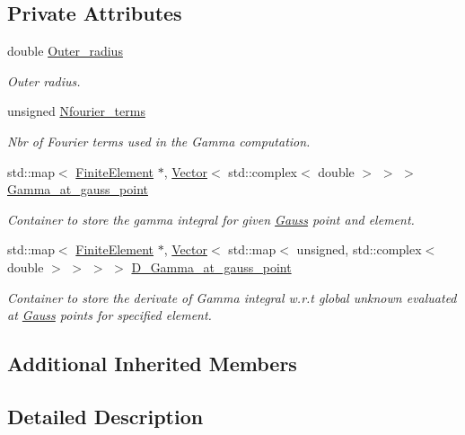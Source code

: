 \subsection*{Private Attributes}
\begin{DoxyCompactItemize}
\item 
double \hyperlink{classoomph_1_1HelmholtzDtNMesh_abcc058c646023fbde29369b858d12e8e}{Outer\+\_\+radius}
\begin{DoxyCompactList}\small\item\em Outer radius. \end{DoxyCompactList}\item 
unsigned \hyperlink{classoomph_1_1HelmholtzDtNMesh_a606cf4e783b8dc36f3c059c4ec8ac503}{Nfourier\+\_\+terms}
\begin{DoxyCompactList}\small\item\em Nbr of Fourier terms used in the Gamma computation. \end{DoxyCompactList}\item 
std\+::map$<$ \hyperlink{classoomph_1_1FiniteElement}{Finite\+Element} $\ast$, \hyperlink{classoomph_1_1Vector}{Vector}$<$ std\+::complex$<$ double $>$ $>$ $>$ \hyperlink{classoomph_1_1HelmholtzDtNMesh_aacfbe2ef31d93e1071460f3b2bad2480}{Gamma\+\_\+at\+\_\+gauss\+\_\+point}
\begin{DoxyCompactList}\small\item\em Container to store the gamma integral for given \hyperlink{classoomph_1_1Gauss}{Gauss} point and element. \end{DoxyCompactList}\item 
std\+::map$<$ \hyperlink{classoomph_1_1FiniteElement}{Finite\+Element} $\ast$, \hyperlink{classoomph_1_1Vector}{Vector}$<$ std\+::map$<$ unsigned, std\+::complex$<$ double $>$ $>$ $>$ $>$ \hyperlink{classoomph_1_1HelmholtzDtNMesh_a1a70bd5ef6e20837f7c9c0ce7abdd91b}{D\+\_\+\+Gamma\+\_\+at\+\_\+gauss\+\_\+point}
\begin{DoxyCompactList}\small\item\em Container to store the derivate of Gamma integral w.\+r.\+t global unknown evaluated at \hyperlink{classoomph_1_1Gauss}{Gauss} points for specified element. \end{DoxyCompactList}\end{DoxyCompactItemize}
\subsection*{Additional Inherited Members}


\subsection{Detailed Description}
